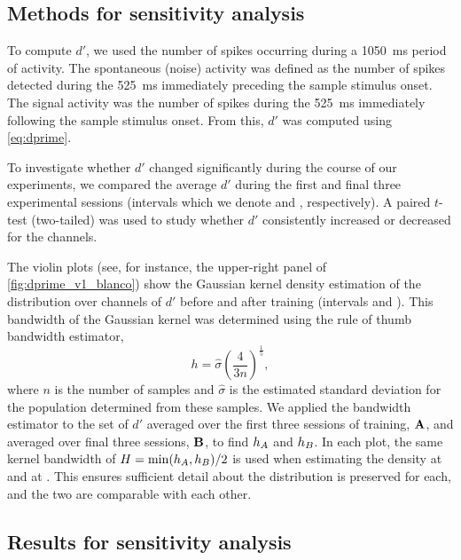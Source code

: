 \subsection{Methods for sensitivity analysis}
\label{sec:violin_plot_method}

To compute $d'$, we used the number of spikes occurring during a \SI{1050}{\milli\second} period of activity.
The spontaneous (noise) activity was defined as the number of spikes detected during the \SI{525}{\milli\second} immediately preceding the sample stimulus onset.
The signal activity was the number of spikes during the \SI{525}{\milli\second} immediately following the sample stimulus onset.
From this, $d'$ was computed using \autoref{eq:dprime}.

To investigate whether $d'$ changed significantly during the course of our experiments, we compared the average $d'$ during the first and final three experimental sessions (intervals which we denote  and , respectively).
A paired $t$-test (two-tailed) was used to study whether $d'$ consistently increased or decreased for the channels.

The violin plots (see, for instance, the upper-right panel of \autoref{fig:dprime_v1_blanco}) show the Gaussian kernel density estimation of the distribution over channels of $d'$ before and after training (intervals  and ).
This bandwidth of the Gaussian kernel was determined using the rule of thumb bandwidth estimator,
\begin{equation}
h = \hat{\sigma} \left( \frac{4}{3 n} \right) ^ \frac{1}{5}
,\label{eq:estimate-bw}\end{equation}
where $n$ is the number of samples and $\hat{\sigma}$ is the estimated standard deviation for the population determined from these samples.
We applied the bandwidth estimator to the set of $d'$ averaged over the first three sessions of training, $\mathbf{A}$, and averaged over final three sessions, $\mathbf{B}$, to find $h_{A}$ and $h_{B}$.
In each plot, the same kernel bandwidth of
$H = \min(h_{A}, h_{B}) / 2$
is used when estimating the density at  and at .
This ensures sufficient detail about the distribution is preserved for each, and the two are comparable with each other.

\subsection{Results for sensitivity analysis}
\label{sec:pl_dprime_v4}


